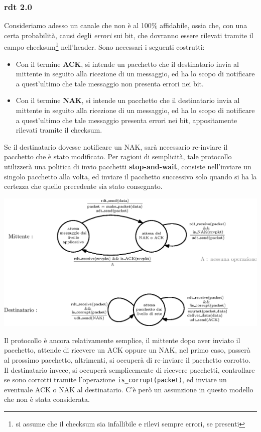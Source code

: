 \documentclass[12pt, letterpaper]{article}
\newcommand{\code}[1]{\colorbox{light-gray}{\texttt{#1}}}
\begin{document}
\subsubsection{rdt 2.0}
Consideriamo adesso un canale che non è al 100\% affidabile, ossia che, con una certa probabilità,
causi degli \textit{errori} sui bit, che dovranno essere rilevati tramite il campo checksum\footnote{
    si assume che il checksum sia infallibile e rilevi sempre errori, se presenti
} nell'header.
Sono necessari i seguenti costrutti:
\begin{itemize}
    \item Con il termine \textbf{ACK}, si intende un pacchetto che il destinatario invia al mittente in seguito
          alla ricezione di un messaggio, ed ha lo
          scopo di notificare a quest'ultimo che tale messaggio non presenta errori nei bit.
    \item Con il termine \textbf{NAK}, si intende un pacchetto che il destinatario invia al mittente in seguito
          alla ricezione di un messaggio, ed ha lo
          scopo di notificare a quest'ultimo che tale messaggio presenta errori nei bit, appositamente rilevati
          tramite il checksum.
\end{itemize}
Se il destinatario dovesse notificare un NAK, sarà necessario re-inviare il pacchetto che è stato modificato.
Per ragioni di semplicità, tale protocollo utilizzerà una politica di invio pacchetti \textbf{stop-and-wait},
consiste nell'inviare un singolo pacchetto alla volta, ed inviare il pacchetto successivo solo quando
si ha la certezza che quello precedente sia stato consegnato.\begin{center}
    \includegraphics[width=1\textwidth ]{images/rdt2.0.eps}
\end{center}
Il protocollo è ancora relativamente semplice, il mittente dopo aver inviato il pacchetto, attende di ricevere un
ACK oppure un NAK, nel primo caso, passerà al prossimo pacchetto, altrimenti, si occuperà di re-inviare il pacchetto
corrotto. Il destinatario invece, si occuperà semplicemente di ricevere pacchetti, controllare se sono corrotti tramite
l'operazione \code{is\_corrupt(packet)}, ed inviare un eventuale ACK o NAK al destinatario.
C'è però un assunzione in questo modello che non è stata considerata.
\end{document}
